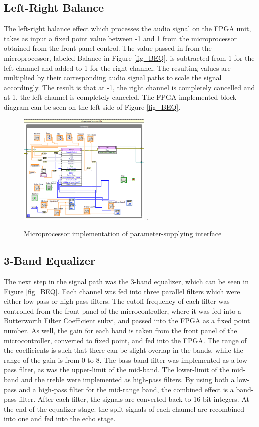 \subsection{Left-Right Balance}
The left-right balance effect which processes the audio signal on the FPGA unit, takes as input a fixed point value between -1 and 1 from the microprocessor obtained from the front panel control. 
The value passed in from the microprocessor, labeled Balance in Figure \ref{fig_BEQ}, is subtracted from 1 for the left channel and added to 1 for the right channel. 
The resulting values are multiplied by their corresponding audio signal paths to scale the signal accordingly. The result is that at -1, the right channel is completely cancelled and at 1, the left channel is completely canceled. 
The FPGA implemented block diagram can be seen on the left side of Figure \ref{fig_BEQ}.

\begin{figure}[!t]
\centering
\includegraphics[width=2.5in]{microcontroller.png}
\DeclareGraphicsExtensions.
\caption{Microprocessor implementation of parameter-supplying interface}
\label{fig_AEPUMicro}
\end{figure}

\subsection{3-Band Equalizer}
The next step in the signal path was the 3-band equalizer, which can be seen in Figure \ref{fig_BEQ}. 
Each channel was fed into three parallel filters which were either low-pass or high-pass filters.
The cutoff frequency of each filter was controlled from the front panel of the microcontroller, where it was fed into a Butterworth Filter Coefficient subvi, and passed into the FPGA as a fixed point number.
As well, the gain for each band is taken from the front panel of the microcontroller, converted to fixed point, and fed into the FPGA.
The range of the coefficients is such that there can be slight overlap in the bands, while the range of the gain is from 0 to 8.
The bass-band filter was implemented as a low-pass filter, as was the upper-limit of the mid-band.
The lower-limit of the mid-band and the treble were implemented as high-pass filters.
By using both a low-pass and a high-pass filter for the mid-range band, the combined effect is a band-pass filter.
After each filter, the signals are converted back to 16-bit integers.
At the end of the equalizer stage. the split-signals of each channel are recombined into one and fed into the echo stage.

